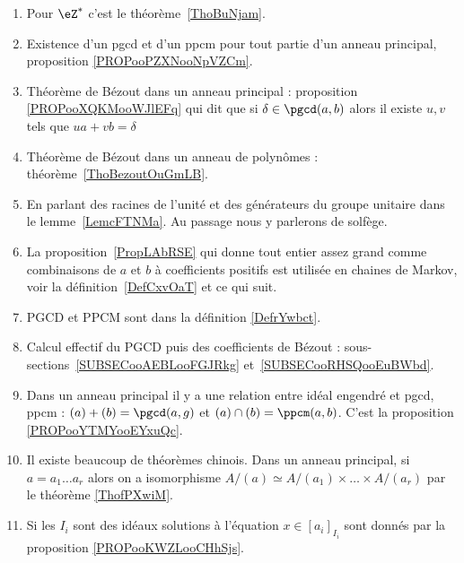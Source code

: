  \label{THEMEooNRZHooYuuHyt}
\begin{enumerate}
	\item
	      Pour \( \eZ^*\) c'est le théorème~\ref{ThoBuNjam}.
	\item
	      Existence d'un pgcd et d'un ppcm pour tout partie d'un anneau principal, proposition \ref{PROPooPZXNooNpVZCm}.
	\item
	      Théorème de Bézout dans un anneau principal : proposition \ref{PROPooXQKMooWJlEFq} qui dit que si \( \delta\in \pgcd(a,b) \) alors il existe \( u,v\) tels que \( ua+vb=\delta\)
	\item
	      Théorème de Bézout dans un anneau de polynômes : théorème~\ref{ThoBezoutOuGmLB}.
	\item
	      En parlant des racines de l'unité et des générateurs du groupe unitaire dans le lemme~\ref{LemcFTNMa}. Au passage nous y parlerons de solfège.
	\item
	      La proposition~\ref{PropLAbRSE} qui donne tout entier assez grand comme combinaisons de \( a \) et \( b\) à coefficients positifs est utilisée en chaines de Markov, voir la définition~\ref{DefCxvOaT} et ce qui suit.
	\item
	      PGCD et PPCM sont dans la définition \ref{DefrYwbct}.
	\item
	      Calcul effectif du PGCD puis des coefficients de Bézout : sous-sections~\ref{SUBSECooAEBLooFGJRkg} et~\ref{SUBSECooRHSQooEuBWbd}.
	\item
	      Dans un anneau principal il y a une relation entre idéal engendré et pgcd, ppcm : \( (a)+(b)=\pgcd(a,g)\) et \( (a)\cap(b)=\ppcm(a,b)\). C'est la proposition \ref{PROPooYTMYooEYxuQc}.
	\item
	      Il existe beaucoup de théorèmes chinois. Dans un anneau principal, si \( a=a_1\ldots a_r\) alors on a isomorphisme \( A/(a)\simeq A/(a_1)\times \ldots\times A/(a_r)\) par le théorème \ref{ThofPXwiM}.
	\item
	      Si les \( I_i\) sont des idéaux  solutions à l'équation \( x\in[a_i]_{I_i}\) sont donnés par la proposition \ref{PROPooKWZLooCHhSjs}.
\end{enumerate}
